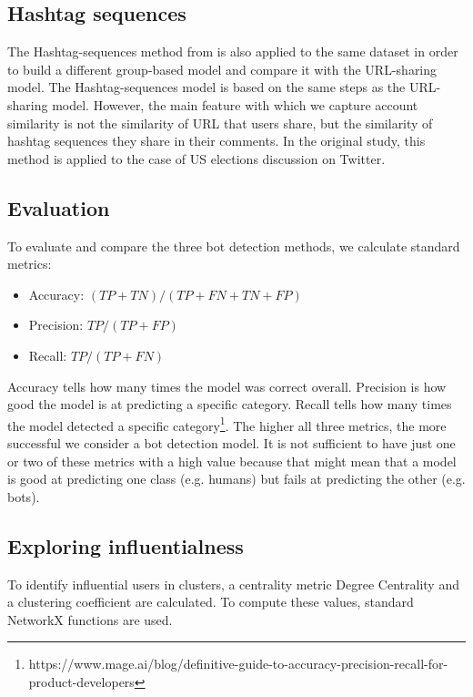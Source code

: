 \subsection{Hashtag sequences}
\label{sec:hashtag-sequences}
The Hashtag-sequences method from \cite{pacheco2020uncovering} is also applied to the same dataset in order to build a different group-based model and compare it with the URL-sharing model. The Hashtag-sequences model is based on the same steps as the URL-sharing model. However, the main feature with which we capture account similarity is not the similarity of URL that users share, but the similarity of hashtag sequences they share in their comments. In the original study\cite{pacheco2020uncovering}, this method is applied to the case of US elections discussion on Twitter. 

\subsection{Evaluation}

To evaluate and compare the three bot detection methods, we calculate standard metrics:
\begin{itemize}
    \item Accuracy: $(TP+TN)/(TP+FN+TN+FP)$
    \item Precision: $TP/(TP+FP)$
    \item Recall: $TP/(TP+FN)$
\end{itemize}

Accuracy tells how many times the model was correct overall. Precision is how good the model is at predicting a specific category. Recall tells how many times the model detected a specific category\footnote{https://www.mage.ai/blog/definitive-guide-to-accuracy-precision-recall-for-product-developers}. The higher all three metrics, the more successful we consider a bot detection model. It is not sufficient to have just one or two of these metrics with a high value because that might mean that a model is good at predicting one class (e.g. humans) but fails at predicting the other (e.g. bots).

\subsection{Exploring influentialness}
To identify influential users in clusters, a centrality metric Degree Centrality and a clustering coefficient are calculated. To compute these values, standard NetworkX functions are used.

